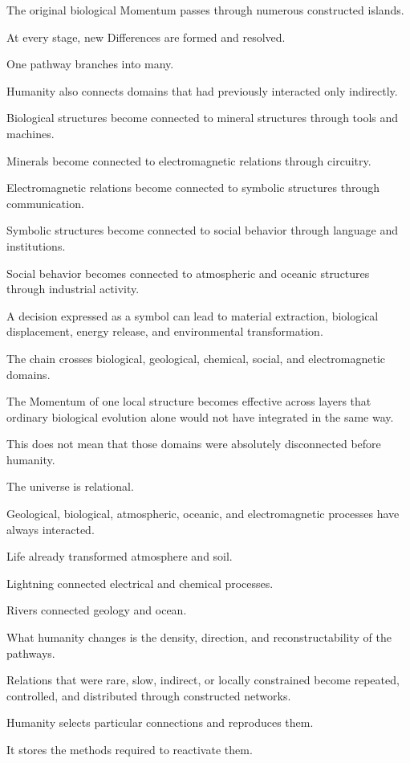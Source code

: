 The original biological Momentum passes through numerous constructed islands.

At every stage, new Differences are formed and resolved.

One pathway branches into many.

Humanity also connects domains that had previously interacted only indirectly.

Biological structures become connected to mineral structures through tools and machines.

Minerals become connected to electromagnetic relations through circuitry.

Electromagnetic relations become connected to symbolic structures through communication.

Symbolic structures become connected to social behavior through language and institutions.

Social behavior becomes connected to atmospheric and oceanic structures through industrial activity.

A decision expressed as a symbol can lead to material extraction, biological displacement, energy release, and environmental transformation.

The chain crosses biological, geological, chemical, social, and electromagnetic domains.

The Momentum of one local structure becomes effective across layers that ordinary biological evolution alone would not have integrated in the same way.

This does not mean that those domains were absolutely disconnected before humanity.

The universe is relational.

Geological, biological, atmospheric, oceanic, and electromagnetic processes have always interacted.

Life already transformed atmosphere and soil.

Lightning connected electrical and chemical processes.

Rivers connected geology and ocean.

What humanity changes is the density, direction, and reconstructability of the pathways.

Relations that were rare, slow, indirect, or locally constrained become repeated, controlled, and distributed through constructed networks.

Humanity selects particular connections and reproduces them.

It stores the methods required to reactivate them.

